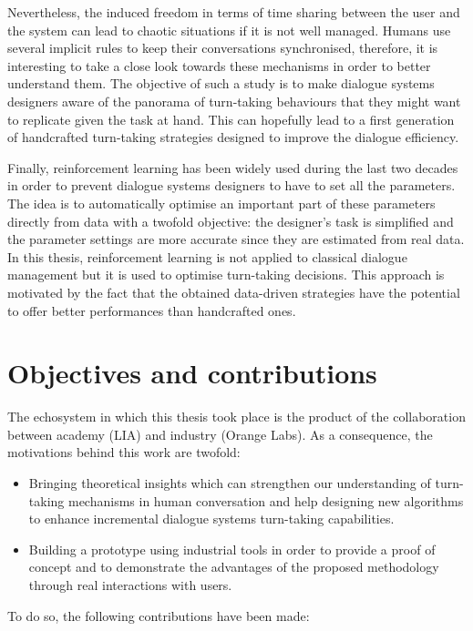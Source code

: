 				Nevertheless, the induced freedom in terms of time sharing between the user and the system can lead to chaotic situations if it is not well managed. Humans use several implicit rules to keep their conversations synchronised, therefore, it is interesting to take a close look towards these mechanisms in order to better understand them. The objective of such a study is to make dialogue systems designers aware of the panorama of turn-taking behaviours that they might want to replicate given the task at hand. This can hopefully lead to a first generation of handcrafted turn-taking strategies designed to improve the dialogue efficiency.
				
				Finally, reinforcement learning has been widely used during the last two decades in order to prevent dialogue systems designers to have to set all the parameters. The idea is to automatically optimise an important part of these parameters directly from data with a twofold objective: the designer's task is simplified and the parameter settings are more accurate since they are estimated from real data. In this thesis, reinforcement learning is not applied to classical dialogue management but it is used to optimise turn-taking decisions. This approach is motivated by the fact that the obtained data-driven strategies have the potential to offer better performances than handcrafted ones.
				
\section*{Objectives and contributions}

				The echosystem in which this thesis took place is the product of the collaboration between academy (LIA) and industry (Orange Labs). As a consequence, the motivations behind this work are twofold:
				
				\begin{itemize}
					\item Bringing theoretical insights which can strengthen our understanding of turn-taking mechanisms in human conversation and help designing new algorithms to enhance incremental dialogue systems turn-taking capabilities.
					\item Building a prototype using industrial tools in order to provide a proof of concept and to demonstrate the advantages of the proposed methodology through real interactions with users.
				\end{itemize}
				
				To do so, the following contributions have been made:
				
